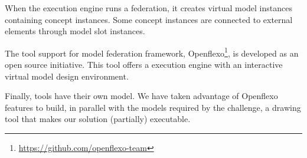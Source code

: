 

When the \FML execution engine runs a federation, it creates virtual
model instances containing concept instances. Some concept instances
are connected to external elements through model slot instances.


The tool support for model federation framework,
Openflexo\footnote{\url{https://github.com/openflexo-team}}, is
developed as an open source initiative. This tool offers a \FML
execution engine with an interactive virtual model design environment.

Finally, tools have their own model. We have taken advantage of
Openflexo features to build, in parallel with the models  required by the challenge, a drawing tool that makes our
solution (partially) executable.
